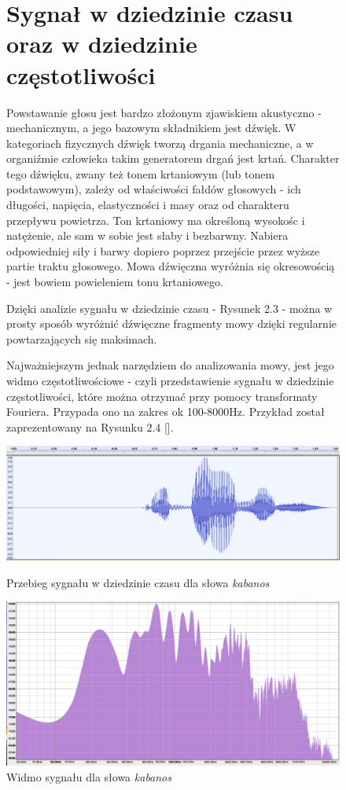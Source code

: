 \documentclass[eng,printmode]{mgr}
\begin{document}
\begin{figure}
 	\section{Sygnał w dziedzinie czasu oraz w dziedzinie częstotliwości}
	Powstawanie głosu jest bardzo złożonym zjawiskiem akustyczno - mechanicznym, a jego bazowym składnikiem jest dźwięk. W kategoriach fizycznych dźwięk tworzą drgania mechaniczne, a w organiźmie człowieka takim generatorem drgań jest krtań. Charakter tego dźwięku, zwany też tonem krtaniowym (lub tonem podstawowym), zależy od właściwości fałdów głosowych - ich długości, napięcia, elastyczności i masy oraz od charakteru przepływu powietrza. Ton krtaniowy ma określoną wysokośc i natężenie, ale sam w sobie jest słaby i bezbarwny. Nabiera odpowiedniej siły i barwy dopiero poprzez przejście przez wyższe partie traktu głosowego. Mowa dźwięczna wyróżnia się okresowością - jest bowiem powieleniem tonu krtaniowego.
	
	 Dzięki analizie sygnału w dziedzinie czasu - Rysunek 2.3 - można w prosty sposób wyróżnić dźwięczne fragmenty mowy dzięki regularnie powtarzających się maksimach. 
	 
	 Najważniejszym jednak narzędziem do analizowania mowy, jest jego widmo częstotliwościowe - czyli przedstawienie sygnału w dziedzinie częstotliwości, które można otrzymać przy pomocy transformaty Fouriera. Przypada ono na zakres ok 100-8000Hz. Przykład został zaprezentowany na Rysunku 2.4 [].
 	\begin{center}
 		\includegraphics[scale=0.3]{kabanosTime.png}
 		\caption{Przebieg sygnału w dziedzinie czasu dla słowa \emph{kabanos}}\vspace{5mm}
 		
 		\includegraphics[scale=0.5]{kabanosSpectrum.png}
 		\caption{Widmo sygnału dla słowa \emph{kabanos}}\vspace{5mm}
 	\end{center}
\end{figure}
  
\end{document}
